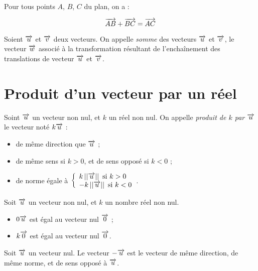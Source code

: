 \begin{propriete}
  Pour tous points $A$, $B$, $C$ du plan, on a :

\[\overrightarrow{AB}+\overrightarrow{BC}=\overrightarrow{AC}\]
\end{propriete}

\begin{definition}
  Soient $\overrightarrow{u}$ et $\overrightarrow{v}$ deux vecteurs. On appelle
  \emph{somme} des vecteurs $\overrightarrow{u}$ et $\overrightarrow{v}$, le vecteur
  $\overrightarrow{w}$ associé à la transformation résultant de l'enchaînement des
    translations de vecteur $\overrightarrow{u}$ et $\overrightarrow{v}$.
  \end{definition}

\section{Produit d'un vecteur par un réel}

\begin{definition}
  Soint $\overrightarrow{u}$ un vecteur non nul, et $k$ un réel non nul. On appelle \emph{produit de $k$ par $\overrightarrow{u}$} le vecteur noté $k\overrightarrow{u}$ :
  \begin{itemize}
    \item de même direction que $\overrightarrow{u}$ ;
    \item de même sens si $k>0$, et de sens opposé si $k<0$ ;
    \item de norme égale à $\left\{\begin{array}{l}k\left|\left|\overrightarrow{u}\right|\right|\text{ si $k>0$}\\-k\left|\left|\overrightarrow{u}\right|\right|\text{ si $k<0$}\end{array}\right.$.
  \end{itemize}
\end{definition}

\begin{definition}
  Soit $\overrightarrow{u}$ un vecteur non nul, et $k$ un nombre réel non nul.
  \begin{itemize}
    \item $0\overrightarrow{u}$ est égal au vecteur nul $\overrightarrow{0}$ ;
    \item $k\overrightarrow{0}$ est égal au vecteur nul $\overrightarrow{0}$.
  \end{itemize}
\end{definition}

\begin{propriete}
  Soit $\overrightarrow{u}$ un vecteur nul. Le vecteur $-\overrightarrow{u}$ est le vecteur de même direction, de même norme, et de sens opposé à $\overrightarrow{u}$.
\end{propriete}

